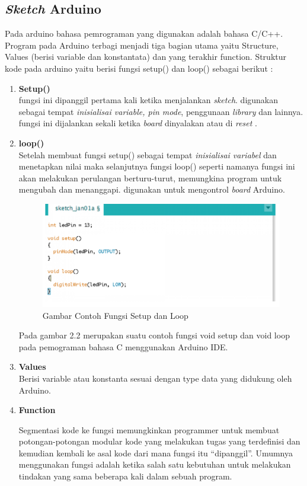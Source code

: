 \subsection{\textit{Sketch} Arduino}
\par Pada arduino bahasa pemrograman yang digunakan adalah bahasa C/C++. Program pada Arduino terbagi menjadi tiga bagian utama yaitu Structure, Values (berisi variable dan konstantata) dan yang terakhir function. Struktur kode pada arduino yaitu berisi fungsi  setup() dan loop() sebagai berikut :
\begin{enumerate}
    \item \textbf{Setup()}\\
    fungsi ini dipanggil pertama kali ketika menjalankan \textit{sketch}. digunakan sebagai tempat \textit{inisialisai variable, pin mode}, penggunaan \textit{library} dan lainnya. fungsi ini dijalankan sekali ketika \textit{board} dinyalakan atau di \textit{reset} .
    \item \textbf{loop()}\\
    Setelah membuat fungsi setup() sebagai tempat \textit{inisialisai variabel} dan menetapkan nilai maka selanjutnya fungsi loop() seperti namanya fungsi ini akan melakukan perulangan berturu-turut, memungkina program untuk mengubah dan menanggapi. digunakan untuk mengontrol \textit{board} Arduino.


\begin{figure}[H]
\centering
\includegraphics[width=1\textwidth]{figures/contoh.png}
\caption{Gambar Contoh Fungsi Setup dan Loop}
\label{print}
\end{figure}

\par Pada gambar 2.2 merupakan suatu contoh fungsi void setup dan void loop pada pemograman bahasa C menggunakan Arduino IDE.

\item \textbf{Values}\\
Berisi variable atau konstanta sesuai dengan type data yang didukung oleh Arduino.
\item \textbf{Function}\\
\par Segmentasi kode ke fungsi memungkinkan programmer untuk membuat potongan-potongan modular kode yang melakukan tugas yang terdefinisi dan kemudian kembali ke asal kode dari mana fungsi itu “dipanggil”. Umumnya menggunakan fungsi adalah ketika salah satu kebutuhan untuk melakukan tindakan yang sama beberapa kali dalam sebuah program.
\end{enumerate}

